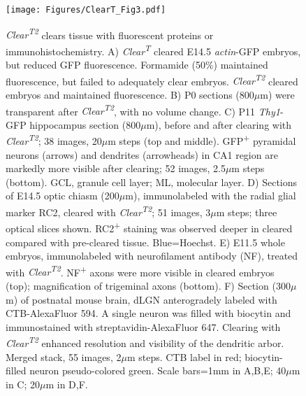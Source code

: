 \begin{figure}[hbtp]
    \begin{center}
        \texttt{[image: Figures/ClearT\_Fig3.pdf]}
        \caption[\emph{Clear\textsuperscript{T2}} clears tissue with fluorescent proteins or immunohistochemistry.]
        {\emph{Clear\textsuperscript{T2}} clears tissue with fluorescent proteins or immunohistochemistry.
        A) \emph{Clear\textsuperscript{T}} cleared E14.5 \emph{actin}-GFP embryos, but reduced GFP fluorescence.
        Formamide (50\%) maintained fluorescence, but failed to adequately clear embryos.
        \emph{Clear\textsuperscript{T2}} cleared embryos and maintained fluorescence.
        B) P0 sections (800$\mu$m) were transparent after \emph{Clear\textsuperscript{T2}}, with no volume change.
        C) P11 \emph{Thy1}-GFP hippocampus section (800$\mu$m), before and after clearing with \emph{Clear\textsuperscript{T2}}; 38 images, 20$\mu$m steps (top and middle).
        GFP\textsuperscript{+} pyramidal neurons (arrows) and dendrites (arrowheads) in CA1 region are markedly more visible after clearing; 52 images, 2.5$\mu$m steps (bottom).
        GCL, granule cell layer; ML, molecular layer.
        D) Sections of E14.5 optic chiasm (200$\mu$m), immunolabeled with the radial glial marker RC2, cleared with \emph{Clear\textsuperscript{T2}}; 51 images, 3$\mu$m steps; three optical slices shown.
        RC2\textsuperscript{+} staining was observed deeper in cleared compared with pre-cleared tissue.
        Blue=Hoechst.
        E) E11.5 whole embryos, immunolabeled with neurofilament antibody (NF), treated with \emph{Clear\textsuperscript{T2}}.
        NF\textsuperscript{+} axons were more visible in cleared embryos (top); magnification of trigeminal axons (bottom).
        F) Section (300$\mu$m) of postnatal mouse brain, dLGN anterogradely labeled with CTB-AlexaFluor 594.
        A single neuron was filled with biocytin and immunostained with streptavidin-AlexaFluor 647.
        Clearing with \emph{Clear\textsuperscript{T2}} enhanced resolution and visibility of the dendritic arbor.
        Merged stack, 55 images, 2$\mu$m steps.
        CTB label in red; biocytin-filled neuron pseudo-colored green. Scale bars=1mm in A,B,E; 40$\mu$m in C; 20$\mu$m in D,F.
        }
        \label{ClearTFig3}
    \end{center}
\end{figure}

